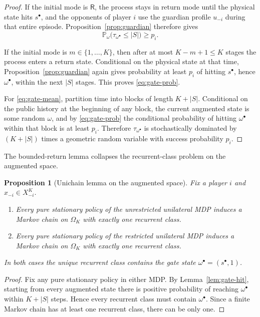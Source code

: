 \documentclass[11pt]{article}
\newtheorem{proposition}[theorem]{Proposition}
\theoremstyle{definition}
\newcommand{\Prob}{\mathbb{P}}
\newcommand{\1}{\mathbf{1}}
\begin{document}
\begin{proof}
If the initial mode is $\mathsf R$, the process stays in return mode until the physical state hits $s^\bullet$, and the opponents of player $i$ use the guardian profile $u_{-i}$ during that entire episode. Proposition~\ref{prop:guardian} therefore gives
\[
\Prob_{\omega}\!\bigl(\tau_{\omega^\bullet}\le |S|\bigr)\ge p_i.
\]

If the initial mode is $m\in\{1,\dots,K\}$, then after at most $K-m+1\le K$ stages the process enters a return state. Conditional on the physical state at that time, Proposition~\ref{prop:guardian} again gives probability at least $p_i$ of hitting $s^\bullet$, hence $\omega^\bullet$, within the next $|S|$ stages. This proves \eqref{eq:gate-prob}.

For \eqref{eq:gate-mean}, partition time into blocks of length $K+|S|$. Conditional on the public history at the beginning of any block, the current augmented state is some random $\omega$, and by \eqref{eq:gate-prob} the conditional probability of hitting $\omega^\bullet$ within that block is at least $p_i$. Therefore $\tau_{\omega^\bullet}$ is stochastically dominated by $(K+|S|)$ times a geometric random variable with success probability $p_i$.
\end{proof}

The bounded-return lemma collapses the recurrent-class problem on the augmented space.

\begin{proposition}[Unichain lemma on the augmented space]\label{prop:aug-unichain}
Fix a player $i$ and $x_{-i}\in X_{-i}^K$.
\begin{enumerate}[label=\textup{(\alph*)},leftmargin=2.5em]
\item Every pure stationary policy of the unrestricted unilateral MDP induces a Markov chain on $\Omega_K$ with exactly one recurrent class.
\item Every pure stationary policy of the restricted unilateral MDP induces a Markov chain on $\Omega_K$ with exactly one recurrent class.
\end{enumerate}
In both cases the unique recurrent class contains the gate state $\omega^\bullet=(s^\bullet,1)$.
\end{proposition}

\begin{proof}
Fix any pure stationary policy in either MDP. By Lemma~\ref{lem:gate-hit}, starting from every augmented state there is positive probability of reaching $\omega^\bullet$ within $K+|S|$ steps. Hence every recurrent class must contain $\omega^\bullet$. Since a finite Markov chain has at least one recurrent class, there can be only one.
\end{proof}
\end{document}
